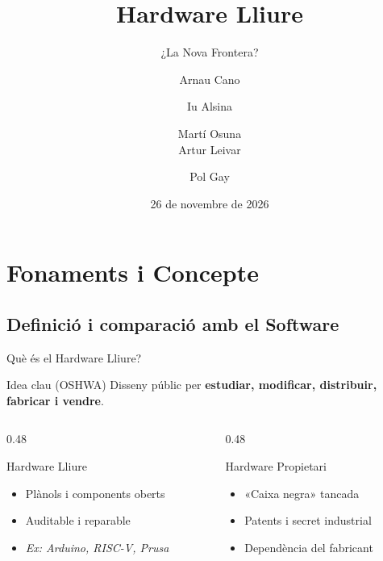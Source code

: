 \documentclass[catalan]{beamer}
\title{Hardware Lliure}
\subtitle{¿La Nova Frontera?}
\author[Grup 7]{
  Arnau Cano \and
  Iu Alsina \and
  Martí Osuna \\
  Artur Leivar \and
  Pol Gay
}
\institute[SLDS]{}
\date{26 de novembre de 2026}
\begin{document}
\frame{
  \titlepage
}


\section{Fonaments i Concepte}

\subsection{Definició i comparació amb el Software}

\begin{frame}{Què és el Hardware Lliure?}
  \begin{block}{Idea clau (OSHWA)}
    Disseny públic per \textbf{estudiar, modificar, distribuir, fabricar i vendre}.
  \end{block}
  \pause
  \vspace{0.4cm}
  \begin{columns}[T]
    \begin{column}{0.48\textwidth}
      \begin{exampleblock}{Hardware Lliure}
        \begin{itemize}
          \item Plànols i components oberts
          \item Auditable i reparable
          \item \textit{Ex: Arduino, RISC-V, Prusa}
        \end{itemize}
      \end{exampleblock}
    \end{column}
    \begin{column}{0.48\textwidth}
      \begin{alertblock}{Hardware Propietari}
        \begin{itemize}
          \item «Caixa negra» tancada
          \item Patents i secret industrial
          \item Dependència del fabricant
        \end{itemize}
      \end{alertblock}
    \end{column}
  \end{columns}
\end{frame}
\end{document}
